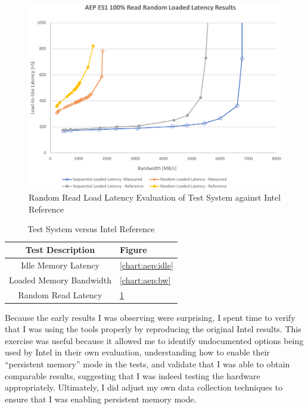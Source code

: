 \begin{figure}
    \centering
    \caption{Random Read Load Latency Evaluation of Test System against Intel Reference}\label{chart:aep:read}
    \includegraphics[scale=0.5]{charts/aep_eval_random_read_load_latency-crop.pdf}
\end{figure}

\begin{table}
    \centering
    \caption{Test System versus Intel Reference}\label{mlc:reference}
    \begin{tabular}{@{}cl@{}}
        Test Description & Figure \\ \toprule
        Idle Memory Latency & \ref{chart:aep:idle} \\
        Loaded Memory Bandwidth & \ref{chart:aep:bw} \\
        Random Read Latency & \ref{chart:aep:read} \\ \bottomrule
    \end{tabular}%
\end{table}


Because the early results I was observing were surprising, I spent time to verify that I was
using the tools properly by reproducing the original Intel results.  This exercise was
useful because it allowed me to identify undocumented options being used by Intel in
their own evaluation, understanding how to enable their ``persistent memory'' mode in
the tests, and validate that I was able to obtain comparable results, suggesting that
I was indeed testing the hardware appropriately.  Ultimately, I did adjust my own data
collection techniques to ensure that I was enabling persistent memory mode.

